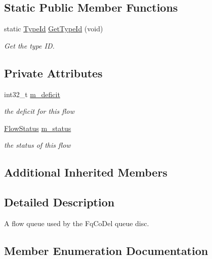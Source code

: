 \subsection*{Static Public Member Functions}
\begin{DoxyCompactItemize}
\item 
static \hyperlink{classns3_1_1TypeId}{Type\+Id} \hyperlink{classns3_1_1FqCoDelFlow_a1636073969f9738ff35b6a35c703f97d}{Get\+Type\+Id} (void)
\begin{DoxyCompactList}\small\item\em Get the type ID. \end{DoxyCompactList}\end{DoxyCompactItemize}
\subsection*{Private Attributes}
\begin{DoxyCompactItemize}
\item 
int32\+\_\+t \hyperlink{classns3_1_1FqCoDelFlow_aae3d869b4299d6a74ed5cb5b65a73808}{m\+\_\+deficit}
\begin{DoxyCompactList}\small\item\em the deficit for this flow \end{DoxyCompactList}\item 
\hyperlink{classns3_1_1FqCoDelFlow_afbdbeaa5fc8659ada26a5d7f0e277b39}{Flow\+Status} \hyperlink{classns3_1_1FqCoDelFlow_ab2a1d20e7e045afd3197e2ea74f70394}{m\+\_\+status}
\begin{DoxyCompactList}\small\item\em the status of this flow \end{DoxyCompactList}\end{DoxyCompactItemize}
\subsection*{Additional Inherited Members}


\subsection{Detailed Description}
A flow queue used by the Fq\+Co\+Del queue disc. 

\subsection{Member Enumeration Documentation}
